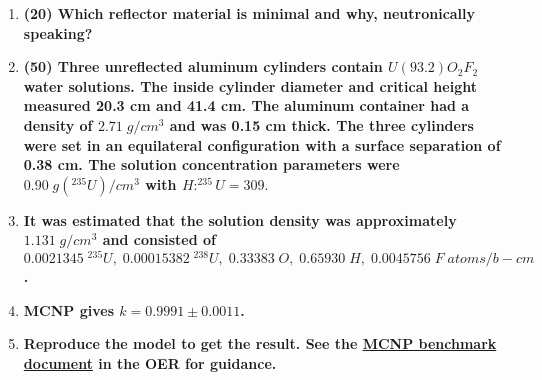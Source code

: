 \documentclass[11pt,a4paper]{article}
\begin{document}
\begin{enumerate}[leftmargin=*,topsep=0pt,font=\bfseries]
        \newpage 
    \item\textbf{(20) Which reflector material is minimal and why, neutronically speaking?}
        \vspace{0.25in}\\

































        \newpage 
    \item\textbf{(50) Three unreflected aluminum cylinders contain $U(93.2)O_2F_2$ water solutions. The inside cylinder diameter and critical height measured 20.3 cm and 41.4 cm. The aluminum container had a density of $2.71 \; g/cm^3$ and was 0.15 cm thick. The three cylinders were set in an equilateral configuration with a surface separation of 0.38 cm. The solution concentration parameters were $0.90 \; g(^{235}U)/cm^3$ with $H:^{235}U = 309$}.
    \item[]\textbf{It was estimated that the solution density was approximately $1.131 \; g/cm^3$ and consisted of $0.0021345\;^{235}U, \; 0.00015382\;^{238}U, \; 0.33383\;O, \; 0.65930\;H, \; 0.0045756\;F \; atoms/b-cm$.}
    \item[]\textbf{MCNP gives $k = 0.9991\pm0.0011$.}
    \item[]\textbf{Reproduce the model to get the result. See the \href{https://courses.lumenlearning.com/uidaho-nuclear/chapter/mcnp/}{MCNP benchmark document} in the OER for guidance.}
        \vspace{0.25in}\\

























\end{enumerate}
\end{document}
